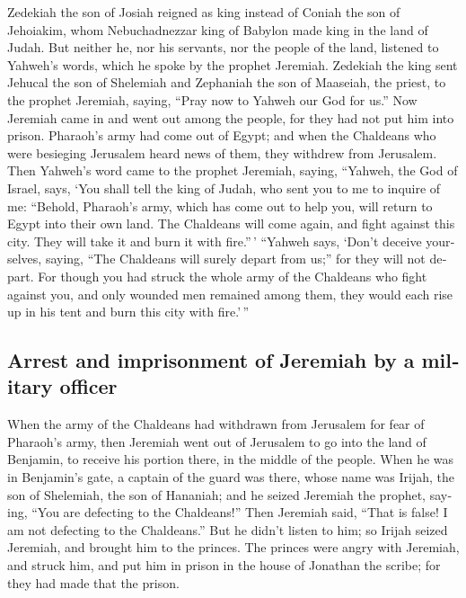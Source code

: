 \begin{paracol}{2}
\begin{otherlanguage}{english}
 Zedekiah the son of Josiah reigned as king instead of
Coniah the son of Jehoiakim, whom Nebuchadnezzar king of Babylon made
king in the land of Judah.  But neither he, nor his
servants, nor the people of the land, listened to Yahweh's words, which
he spoke by the prophet Jeremiah.  Zedekiah the king sent
Jehucal the son of Shelemiah and Zephaniah the son of Maaseiah, the
priest, to the prophet Jeremiah, saying, ``Pray now to Yahweh our God
for us.''  Now Jeremiah came in and went out among the
people, for they had not put him into prison.  Pharaoh's
army had come out of Egypt; and when the Chaldeans who were besieging
Jerusalem heard news of them, they withdrew from Jerusalem.
 Then Yahweh's word came to the prophet Jeremiah, saying,
 ``Yahweh, the God of Israel, says, `You shall tell the
king of Judah, who sent you to me to inquire of me: ``Behold, Pharaoh's
army, which has come out to help you, will return to Egypt into their
own land.  The Chaldeans will come again, and fight
against this city. They will take it and burn it with fire.''\,'
 ``Yahweh says, `Don't deceive yourselves, saying, ``The
Chaldeans will surely depart from us;'' for they will not depart.
 For though you had struck the whole army of the
Chaldeans who fight against you, and only wounded men remained among
them, they would each rise up in his tent and burn this city with
fire.'\,''

\hypertarget{arrest-and-imprisonment-of-jeremiah-by-a-military-officer}{%
\subsection{Arrest and imprisonment of Jeremiah by a military
officer}\label{arrest-and-imprisonment-of-jeremiah-by-a-military-officer}}

 When the army of the Chaldeans had withdrawn from
Jerusalem for fear of Pharaoh's army,  then Jeremiah went
out of Jerusalem to go into the land of Benjamin, to receive his portion
there, in the middle of the people.  When he was in
Benjamin's gate, a captain of the guard was there, whose name was
Irijah, the son of Shelemiah, the son of Hananiah; and he seized
Jeremiah the prophet, saying, ``You are defecting to the Chaldeans!''
 Then Jeremiah said, ``That is false! I am not defecting
to the Chaldeans.'' But he didn't listen to him; so Irijah seized
Jeremiah, and brought him to the princes.  The princes
were angry with Jeremiah, and struck him, and put him in prison in the
house of Jonathan the scribe; for they had made that the prison.


\end{otherlanguage}
\end{paracol}
